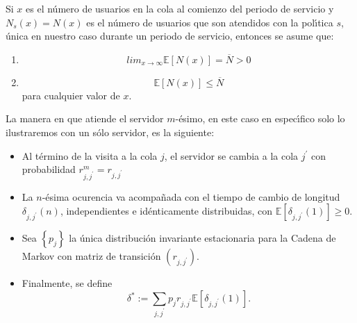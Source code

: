 \documentclass{article}
\newcommand{\esp}{\mathbb{E}}
\numberwithin{equation}{section}
\begin{document}
Si $x$ es el n{\'u}mero de usuarios en la cola al comienzo del
periodo de servicio y $N_{s}\left(x\right)=N\left(x\right)$ es el
n{\'u}mero de usuarios que son atendidos con la pol{\'\i}tica $s$,
{\'u}nica en nuestro caso durante un periodo de servicio, entonces
se asume que:
\begin{enumerate}
\item
\begin{equation}\label{S1}
lim_{x\rightarrow\infty}\esp\left[N\left(x\right)\right]=\overline{N}>0
\end{equation}
\item
\begin{equation}\label{S2}
\esp\left[N\left(x\right)\right]\leq \overline{N} \end{equation}
para cualquier valor de $x$.
\end{enumerate}
La manera en que atiende el servidor $m$-{\'e}simo, en este caso
en espec{\'\i}fico solo lo ilustraremos con un s{\'o}lo servidor,
es la siguiente:
\begin{itemize}
\item Al t{\'e}rmino de la visita a la cola $j$, el servidor se
cambia a la cola $j^{'}$ con probabilidad
$r_{j,j^{'}}^{m}=r_{j,j^{'}}$

\item La $n$-{\'e}sima ocurencia va acompa{\~n}ada con el tiempo
de cambio de longitud $\delta_{j,j^{'}}\left(n\right)$,
independientes e id{\'e}nticamente distribuidas, con
$\esp\left[\delta_{j,j^{'}}\left(1\right)\right]\geq0$.

\item Sea $\left\{p_{j}\right\}$ la {\'u}nica distribuci{\'o}n
invariante estacionaria para la Cadena de Markov con matriz de
transici{\'o}n $\left(r_{j,j^{'}}\right)$.

\item Finalmente, se define
\begin{equation}
\delta^{*}:=\sum_{j,j^{'}}p_{j}r_{j,j^{'}}\esp\left[\delta_{j,j^{'}}\left(1\right)\right].
\end{equation}
\end{itemize}



\printindex
\end{document}
